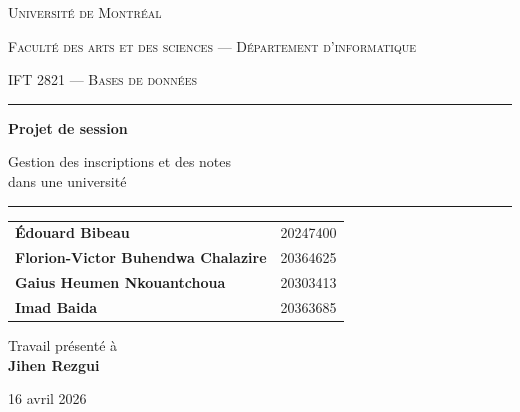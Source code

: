 \documentclass[11pt,a4paper]{article}
\begin{document}
\begin{titlepage}
    \centering
    \vspace*{1.5cm}

    {\scshape\Large Université de Montréal \par}
    \vspace{0.3cm}
    {\scshape\large Faculté des arts et des sciences --- Département d'informatique \par}
    \vspace{0.2cm}
    {\scshape IFT 2821 --- Bases de données \par}

    \vspace{2.5cm}
    {\color{udemblue}\rule{\linewidth}{0.6mm}}
    \vspace{0.6cm}

    {\Huge\bfseries Projet de session\par}
    \vspace{0.5cm}
    {\LARGE Gestion des inscriptions et des notes\\dans une université\par}

    \vspace{0.5cm}
    {\color{udemblue}\rule{\linewidth}{0.6mm}}

    \vspace{2cm}
    
    \begin{tabular}{ll}
        \textbf{Édouard Bibeau}                  & 20247400 \\
        \textbf{Florion-Victor Buhendwa Chalazire} & 20364625 \\
        \textbf{Gaius Heumen Nkouantchoua}        & 20303413   \\
        \textbf{Imad Baida}                       & 20363685      \\
    \end{tabular}

    \vfill

    {\large Travail présenté à\\[0.2cm]\textbf{Jihen Rezgui}\par}
    \vspace{0.8cm}
    {\large 16 avril 2026\par}
\end{titlepage}

\tableofcontents
\newpage


\end{document}
